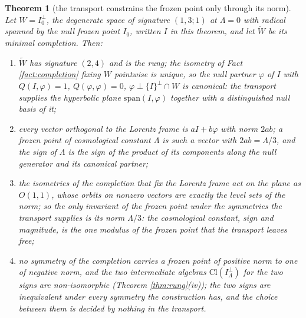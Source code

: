 \documentclass[11pt]{article}
\newtheorem{theorem}{Theorem}[section]
\theoremstyle{definition}
\newcommand{\Cl}{\mathrm{Cl}}
\begin{document}
\begin{theorem}[the transport constrains the frozen point only through its norm]\label{thm:free}
Let $W = I_{0}^{\perp}$, the degenerate space of signature $(1,3;1)$ at $\Lambda = 0$ with radical spanned by the null frozen point $I_{0}$, written $I$ in this theorem, and let $\widetilde W$ be its minimal completion. Then:
\begin{enumerate}
\item[(i)] $\widetilde W$ has signature $(2,4)$ and is the rung; the isometry of Fact \ref{fact:completion} fixing $W$ pointwise is unique, so the null partner $\varphi$ of $I$ with $Q(I,\varphi) = 1$, $Q(\varphi,\varphi) = 0$, $\varphi \perp \{I\}^{\perp} \cap W$ is canonical: the transport supplies the hyperbolic plane $\mathrm{span}(I, \varphi)$ together with a distinguished null basis of it;
\item[(ii)] every vector orthogonal to the Lorentz frame is $aI + b\varphi$ with norm $2ab$; a frozen point of cosmological constant $\Lambda$ is such a vector with $2ab = \Lambda/3$, and the sign of $\Lambda$ is the sign of the product of its components along the null generator and its canonical partner;
\item[(iii)] the isometries of the completion that fix the Lorentz frame act on the plane as $O(1,1)$, whose orbits on nonzero vectors are exactly the level sets of the norm; so the only invariant of the frozen point under the symmetries the transport supplies is its norm $\Lambda/3$: the cosmological constant, sign and magnitude, is the one modulus of the frozen point that the transport leaves free;
\item[(iv)] no symmetry of the completion carries a frozen point of positive norm to one of negative norm, and the two intermediate algebras $\Cl(I_{\Lambda}^{\perp})$ for the two signs are non-isomorphic (Theorem \ref{thm:rung}(iv)); the two signs are inequivalent under every symmetry the construction has, and the choice between them is decided by nothing in the transport.
\end{enumerate}
\end{theorem}
\end{document}
